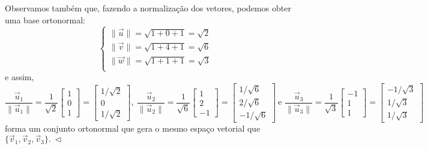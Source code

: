 \begin{ex}
Observamos também que, fazendo a normalização dos vetores, podemos obter uma base ortonormal:
\begin{equation}
\left\{
  \begin{array}{ll}
   \|\vec{u}\| = \sqrt{1 + 0 + 1} = \sqrt{2} \\
   \|\vec{v}\| = \sqrt{1 + 4 + 1} = \sqrt{6} \\
   \|\vec{w}\| = \sqrt{1 + 1 + 1} = \sqrt{3} \\
  \end{array}
\right.
\end{equation} e assim,
\begin{equation}
\frac{\vec{u}_1}{\|\vec{u}_1\|} = \frac{1}{\sqrt{2}}
\begin{bmatrix}
1 \\ 0 \\ 1
\end{bmatrix} =
\begin{bmatrix}
1/\sqrt{2} \\ 0 \\ 1/\sqrt{2}
\end{bmatrix}, \
\frac{\vec{u}_2}{\|\vec{u}_2\|} = \frac{1}{\sqrt{6}}
\begin{bmatrix}
1 \\ 2 \\ -1
\end{bmatrix} =
\begin{bmatrix}
1/\sqrt{6} \\ 2/\sqrt{6} \\ -1/\sqrt{6}
\end{bmatrix} \ \text{e }
\frac{\vec{u}_3}{\|\vec{u}_3\|} = \frac{1}{\sqrt{3}}
\begin{bmatrix}
-1 \\ 1 \\ 1
\end{bmatrix} =
\begin{bmatrix}
-1/\sqrt{3} \\ 1/\sqrt{3} \\ 1/\sqrt{3}
\end{bmatrix}
\end{equation} forma um conjunto ortonormal que gera o mesmo espaço vetorial que $\{ \vec{v}_1, \vec{v}_2, \vec{v}_3 \}. \ \lhd$
\end{ex}



